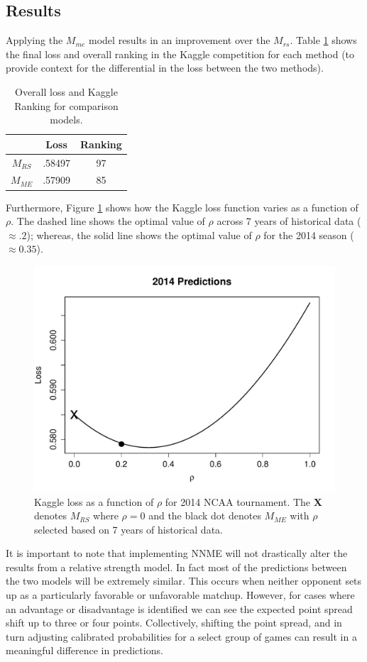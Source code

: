 \documentclass[letterpaper,12pt]{article}
\begin{document}
 \subsection{Results}
Applying the $M_{me}$ model results in an improvement over the $M_{rs}$. Table \ref{tab:results} shows the final loss and overall ranking in the Kaggle competition for each method (to provide context for the differential in the loss between the two methods).

\begin{table}[h!]
\caption{Overall loss and Kaggle Ranking for comparison models.\label{tab:results}}
\centering
\begin{tabular}{|c|cc|}
  \hline
    & Loss & Ranking\\ 
  \hline
  $M_{RS}$ & .58497 & 97 \\
  $M_{ME}$ & .57909 & 85 \\
   \hline
   \hline
\end{tabular}
\end{table}

Furthermore, Figure \ref{fig:result} shows how the Kaggle loss function varies as a function of $\rho$. The dashed line shows the optimal value of $\rho$ across 7 years of historical data ($\approx .2$); whereas, the solid line shows the optimal value of $\rho$ for the 2014 season ($\approx 0.35$). 
\begin{figure}[h!]
\centering
\includegraphics[width=.8\textwidth]{Predictions.pdf}
\caption{Kaggle loss as a function of $\rho$ for 2014 NCAA tournament. The {\bf X} denotes $M_{RS}$ where $\rho = 0$ and the black dot denotes $M_{ME}$ with $\rho$ selected based on 7 years of historical data.}
\label{fig:result}
\end{figure} 

It is important to note that implementing NNME will not drastically alter the results from a relative strength model. In fact most of the predictions between the two models will be extremely similar. This occurs when neither opponent sets up as a particularly favorable or unfavorable matchup. However, for cases where an advantage or disadvantage is identified we can see the expected point spread shift up to three or four points. Collectively, shifting the point spread, and in turn adjusting calibrated probabilities for a select group of games can result in a meaningful difference in predictions. 
\end{document}

